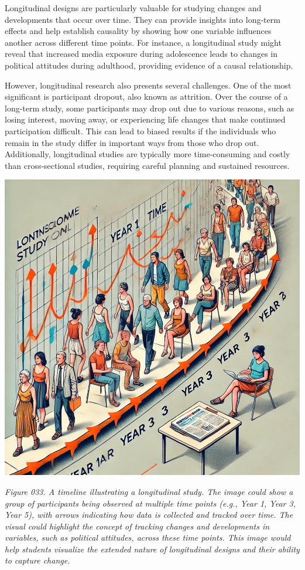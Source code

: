 \documentclass[
]{book}
\begin{document}
Longitudinal designs are particularly valuable for studying changes and developments that occur over time. They can provide insights into long-term effects and help establish causality by showing how one variable influences another across different time points. For instance, a longitudinal study might reveal that increased media exposure during adolescence leads to changes in political attitudes during adulthood, providing evidence of a causal relationship.

However, longitudinal research also presents several challenges. One of the most significant is participant dropout, also known as attrition. Over the course of a long-term study, some participants may drop out due to various reasons, such as losing interest, moving away, or experiencing life changes that make continued participation difficult. This can lead to biased results if the individuals who remain in the study differ in important ways from those who drop out. Additionally, longitudinal studies are typically more time-consuming and costly than cross-sectional studies, requiring careful planning and sustained resources.

\includegraphics[width=1\linewidth,height=\textheight,keepaspectratio]{images/fig033.jpg}

\emph{Figure 033. A timeline illustrating a longitudinal study. The image could show a group of participants being observed at multiple time points (e.g., Year 1, Year 3, Year 5), with arrows indicating how data is collected and tracked over time. The visual could highlight the concept of tracking changes and developments in variables, such as political attitudes, across these time points. This image would help students visualize the extended nature of longitudinal designs and their ability to capture change.}
\end{document}
